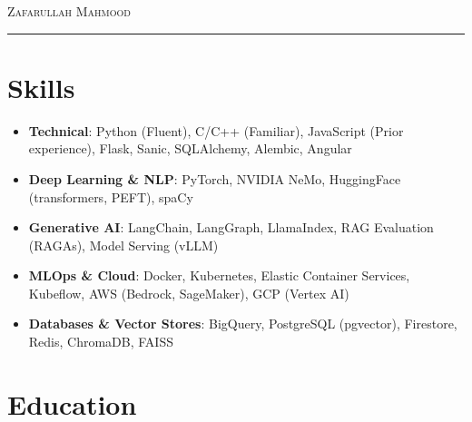 \documentclass{ExpressiveResume}
\begin{document}
\begin{center}
    {\Huge \textsc{Zafarullah Mahmood}}
    \vspace{2pt}

    \rule{\linewidth}{0.5pt}
    \vspace{4pt}

    \large
     \contactseparator
     \contactseparator
     \contactseparator
     \contactseparator
     \contactseparator
\end{center}

\thispagestyle{plain}

\vspace{-5pt}
\section{Skills}
\begin{itemize}[leftmargin=*]
    \item \textbf{Technical}: Python (Fluent), C/C++ (Familiar), JavaScript (Prior experience), Flask, Sanic, SQLAlchemy, Alembic, Angular
    \item \textbf{Deep Learning \& NLP}: PyTorch, NVIDIA NeMo, HuggingFace (transformers, PEFT), spaCy
    \item \textbf{Generative AI}: LangChain, LangGraph, LlamaIndex, RAG Evaluation (RAGAs), Model Serving (vLLM)
    \item \textbf{MLOps \& Cloud}: Docker, Kubernetes, Elastic Container Services, Kubeflow, AWS (Bedrock, SageMaker), GCP (Vertex AI)
    \item \textbf{Databases \& Vector Stores}: BigQuery, PostgreSQL (pgvector), Firestore, Redis, ChromaDB, FAISS
\end{itemize}

\section{Education}
\end{document}
